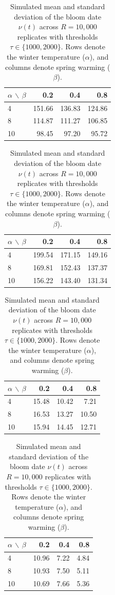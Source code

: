 \documentclass[12pt,letterpaper]{article}
\begin{document}
\begin{table}[t]
\centering
\caption{Simulated mean and standard deviation of the bloom date
$\nu(t)$ across $R=10{,}000$ replicates with thresholds $\tau\in\{1000,2000\}$. Rows denote the winter
temperature ($\alpha$), and columns denote spring warming ($\beta$).}
\label{tab:sim_piecewise_all}

\setlength{\tabcolsep}{6pt}
\renewcommand{\arraystretch}{1.15}

\begin{minipage}{0.49\linewidth}
\centering
{}
\label{tab:sim_mean_1000}
\begin{tabular}{lrrr}
\toprule
$\alpha$ $\backslash$ $\beta$ & 0.2 & 0.4 & 0.8 \\
\midrule
4  & 151.66 & 136.83 & 124.86 \\
8  & 114.87 & 111.27 & 106.85 \\
10 &  98.45 &  97.20 &  95.72 \\
\bottomrule
\end{tabular}

\vspace{1.0em}


\label{tab:sim_mean_2000}
\begin{tabular}{lrrr}
\toprule
$\alpha$ $\backslash$ $\beta$ & 0.2 & 0.4 & 0.8 \\
\midrule
4  & 199.54 & 171.15 & 149.16 \\
8  & 169.81 & 152.43 & 137.37 \\
10 & 156.22 & 143.40 & 131.34 \\
\bottomrule
\end{tabular}

\end{minipage}
\hfill
\begin{minipage}{0.49\linewidth}
\centering
{}
\label{tab:sim_sd_1000}
\begin{tabular}{lrrr}
\toprule
$\alpha$ $\backslash$ $\beta$ & 0.2 & 0.4 & 0.8 \\
\midrule
4  & 15.48 & 10.42 &  7.21 \\
8  & 16.53 & 13.27 & 10.50 \\
10 & 15.94 & 14.45 & 12.71 \\
\bottomrule
\end{tabular}
\vspace{1.0em}

\label{tab:sim_sd_2000}
\begin{tabular}{lrrr}
\toprule
$\alpha$ $\backslash$ $\beta$ & 0.2 & 0.4 & 0.8 \\
\midrule
4  & 10.96 & 7.22 & 4.84 \\
8  & 10.93 & 7.50 & 5.11 \\
10 & 10.69 & 7.66 & 5.36 \\
\bottomrule
\end{tabular}
\end{minipage}
\end{table}


\newpage




\end{document}

